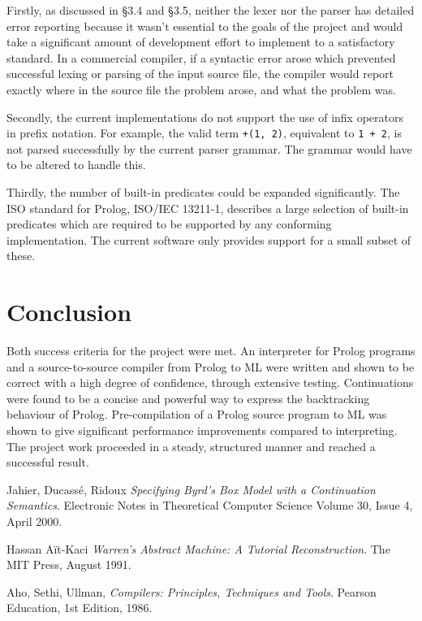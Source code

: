 \documentclass[12pt]{article}
\begin{document}
Firstly, as discussed in \S3.4 and \S3.5, neither the lexer nor the parser has detailed error reporting because it wasn't essential to the goals of the project and would take a significant amount of development effort to implement to a satisfactory standard. 
In a commercial compiler, if a syntactic error arose which prevented successful lexing or parsing of the input source file, the compiler would report exactly where in the source file the problem arose, and what the problem was.

Secondly, the current implementations do not support the use of infix operators in prefix notation. 
For example, the valid term \verb|+(1, 2)|, equivalent to \verb|1 + 2|, is not parsed successfully by the current parser grammar. 
The grammar would have to be altered to handle this.

Thirdly, the number of built-in predicates could be expanded significantly. 
The ISO standard for Prolog, ISO/IEC 13211-1, describes a large selection of built-in predicates which are required to be supported by any conforming implementation. 
The current software only provides support for a small subset of these.


\newpage

\section{Conclusion}

Both success criteria for the project were met. An interpreter for Prolog programs and a source-to-source compiler from Prolog to ML were written and shown to be correct with a high degree of confidence, through extensive testing. Continuations were found to be a concise and powerful way to express the backtracking behaviour of Prolog. Pre-compilation of a Prolog source program to ML was shown to give significant performance improvements compared to interpreting. The project work proceeded in a steady, structured manner and reached a successful result. 

\begin{thebibliography}{9}

  Jahier, Ducass\'e, Ridoux
  \emph{Specifying Byrd's Box Model with a Continuation Semantics}.
  Electronic Notes in Theoretical Computer Science
  Volume 30, Issue 4,
  April 2000.

  Hassan A\"it-Kaci
  \emph{Warren's Abstract Machine: A Tutorial Reconstruction}.
  The MIT Press,
  August 1991.
  
  Aho, Sethi, Ullman,
  \emph{Compilers: Principles, Techniques and Tools}.
  Pearson Education,
  1st Edition,
  1986.

\end{thebibliography}
\end{document}
